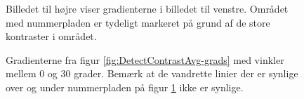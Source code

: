 \begin{figure}[htbp]
  \centering
  \begin{minipage}[b]{5 cm}
  \end{minipage}
  \begin{minipage}[b]{5 cm}
  \end{minipage}
  \caption{Billedet til højre viser gradienterne i billedet til venstre. Området med nummerpladen er tydeligt markeret på grund af de store kontraster i området.}
  \label{fig:DetectContrastAvg-grads}
  \end{figure}

\begin{figure}[htp]
  \centering
  \caption{Gradienterne fra figur \vref{fig:DetectContrastAvg-grads} med vinkler mellem 0 og 30 grader. Bemærk at de vandrette linier der er synlige over og under nummerpladen på figur \ref{fig:DetectContrastAvg-grads} ikke er synlige.}
  \label{fig:DetectContrastAvg-hgrads}  
\end{figure}

